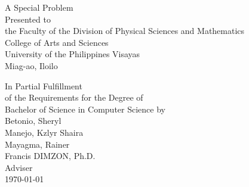 \begin{titlepage}
\centering


\vspace{0.75cm}
A Special Problem\\
Presented to\\
the Faculty of the Division of Physical Sciences and Mathematics\\
College of Arts and Sciences\\
University of the Philippines Visayas\\
Miag-ao, Iloilo

\vspace{0.8cm}
In Partial Fulfillment\\
of the Requirements for the Degree of\\
Bachelor of Science in Computer Science
\vspace{1.1cm}
by\\

Betonio, Sheryl  \\
Manejo, Kzlyr Shaira  \\
Mayagma, Rainer  \\

\vspace{0.8cm}
Francis DIMZON, Ph.D. \\
Adviser\\


\vspace{0.8cm}
\today
\end{titlepage}
